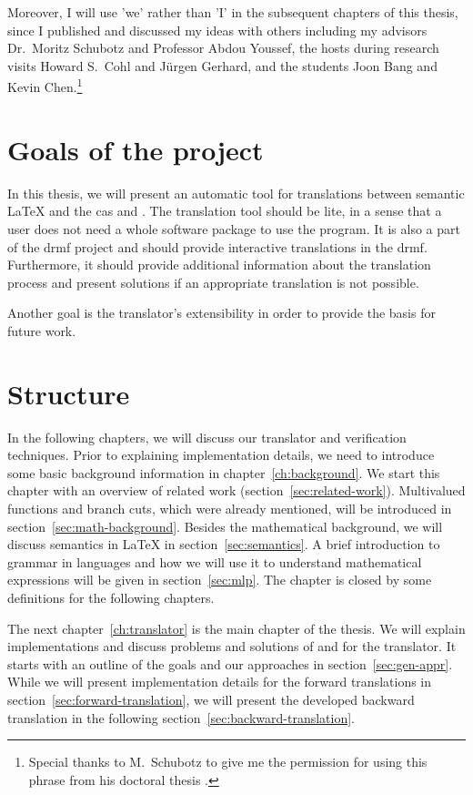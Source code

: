Moreover, I will use 'we' rather than 'I' in the subsequent chapters of this thesis, since I published and discussed my ideas with others including my advisors Dr.~Moritz Schubotz and Professor Abdou Youssef, the hosts during research visits Howard S.~Cohl and J\"urgen Gerhard, and the students Joon Bang and Kevin Chen.\footnote{Special thanks to M.~Schubotz to give me the permission for using this phrase from his doctoral thesis \cite{MORITZ:Dis}.} 

\section{Goals of the project}
In this thesis, we will present an automatic tool for translations between semantic \LaTeX{} and the \gls{cas} \Maple{} and \Mathematica. The translation tool should be lite, in a sense that a user does not need a whole software package to use the program. It is also a part of the \gls{drmf} project and should provide interactive translations in the \gls{drmf}. Furthermore, it should provide additional information about the translation process and present solutions if an appropriate translation is not possible.

Another goal is the translator's extensibility in order to provide the basis for future work.

\section{Structure}
In the following chapters, we will discuss our translator and verification techniques. Prior to explaining implementation details, we need to introduce some basic background information in chapter~\ref{ch:background}. We start this chapter with an overview of related work (section~\ref{sec:related-work}). Multivalued functions and branch cuts, which were already mentioned, will be introduced in section~\ref{sec:math-background}. Besides the mathematical background, we will discuss semantics in \LaTeX{} in section~\ref{sec:semantics}. A brief introduction to grammar in languages and how we will use it to understand mathematical expressions will be given in section~\ref{sec:mlp}. The chapter is closed by some definitions for the following chapters.

The next chapter~\ref{ch:translator} is the main chapter of the thesis. We will explain implementations and discuss problems and solutions of and for the translator. It starts with an outline of the goals and our approaches in section~\ref{sec:gen-appr}. While we will present implementation details for the forward translations in section~\ref{sec:forward-translation}, we will present the developed backward translation in the following section~\ref{sec:backward-translation}.

